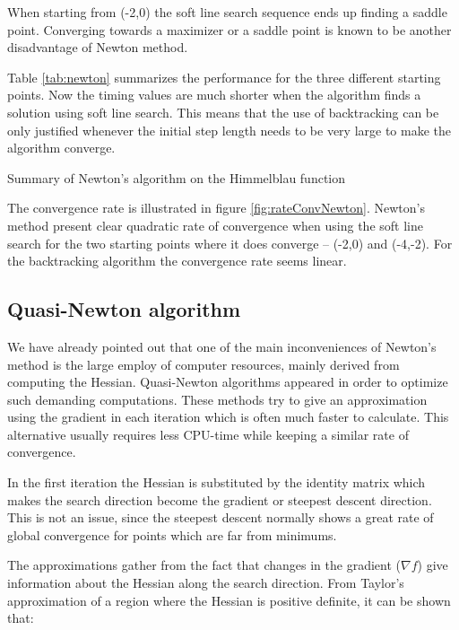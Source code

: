 When starting from (-2,0) the soft line search sequence ends up finding a saddle point. Converging towards a maximizer or a saddle point is known to be another disadvantage of Newton method.
 
Table \ref{tab:newton} summarizes the performance for the three different starting points. Now the timing values are much shorter when the algorithm finds a solution using soft line search. This means that the use of backtracking can be only justified whenever the initial step length needs to be very large to make the algorithm converge.

\begin{table}[H]
\centering

\caption{Summary of Newton's algorithm on the Himmelblau function}
\label{tab:newton}
\end{table}

The convergence rate is illustrated in figure \ref{fig:rateConvNewton}. Newton's method present clear quadratic rate of convergence when using the soft line search for the two starting points where it does converge -- (-2,0) and (-4,-2). For the backtracking algorithm the convergence rate seems linear. 

\subsection{Quasi-Newton algorithm}

We have already pointed out that one of the main inconveniences of Newton's method is the large employ of computer resources, mainly derived from computing the Hessian. Quasi-Newton algorithms appeared in order to optimize such demanding computations. These methods try to give an approximation using the gradient in each iteration which is often much faster to calculate. This alternative usually requires less CPU-time while keeping a similar rate of convergence. 

In the first iteration the Hessian is substituted by the identity matrix which makes the search direction become the gradient or steepest descent direction. This is not an issue, since the steepest descent normally shows a great rate of global convergence for points which are far from minimums.

The approximations gather from the fact that changes in the gradient ($\nabla f$) give information about the Hessian along the search direction. From Taylor's approximation of a region where the Hessian is positive definite, it can be shown that:

